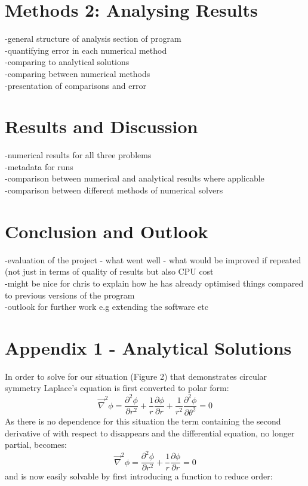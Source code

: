 \documentclass{article}
\begin{document}
\section{Methods 2: Analysing Results}
-general structure of analysis section of program \\
-quantifying error in each numerical method \\
-comparing to analytical solutions \\
-comparing between numerical methods \\
-presentation of comparisons and error \\


\section{Results and Discussion}
-numerical results for all three problems\\
-metadata for runs \\
-comparison between numerical and analytical results where applicable\\
-comparison between different methods of numerical solvers\\

\section{Conclusion and Outlook}
-evaluation of the project - what went well - what would be improved if repeated (not just in terms of quality of results but also CPU cost\\
-might be nice for chris to explain how he has already optimised things compared to previous versions of the program \\
-outlook for further work e.g extending the software etc \\


\section{Appendix 1 - Analytical Solutions}
In order to solve for our situation (Figure 2) that demonstrates circular symmetry Laplace's equation is first converted to polar form:
\begin{equation}
\vec{\nabla}^2\phi = \frac{\partial^2\phi}{\partial r^2}+\frac{1}{r}\frac{\partial\phi}{\partial r}+\frac{1}{r^2} \frac{\partial^2\phi}{\partial\theta^2}=0
\label{6}
\end{equation}
As there is no \theta\) dependence for this situation the term containing the second derivative of \phi\) with respect to \theta\) disappears and the differential equation, no longer partial, becomes:
\begin{equation}
\vec{\nabla}^2\phi = \frac{\partial^2\phi}{\partial r^2}+\frac{1}{r}\frac{\partial\phi}{\partial r}=0
\label{8}
\end{equation}
and is now easily solvable by first introducing a function to reduce order:
\end{document}
